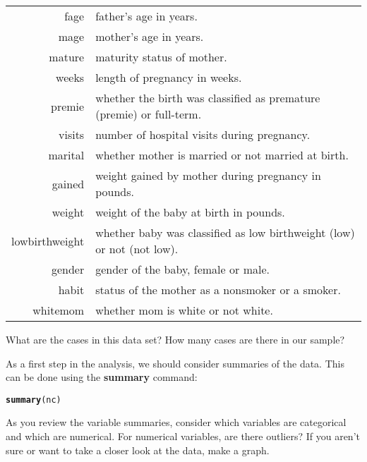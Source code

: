 \documentclass{article}\usepackage[]{graphicx}\usepackage[]{color}
\makeatletter
\newcommand{\hlstr}[1]{\textcolor[rgb]{0.192,0.494,0.8}{#1}}%
\newcommand{\hlstd}[1]{\textcolor[rgb]{0.345,0.345,0.345}{#1}}%
\newcommand{\hlkwd}[1]{\textcolor[rgb]{0.737,0.353,0.396}{\textbf{#1}}}%
\newenvironment{kframe}{%
 \def\at@end@of@kframe{}%
 \ifinner\ifhmode%
  \def\at@end@of@kframe{\end{minipage}}%
  \begin{minipage}{\columnwidth}%
 \fi\fi%
 \def\FrameCommand##1{\hskip\@totalleftmargin \hskip-\fboxsep
 \colorbox{shadecolor}{##1}\hskip-\fboxsep
     \hskip-\linewidth \hskip-\@totalleftmargin \hskip\columnwidth}%
 \MakeFramed {\advance\hsize-\width
   \@totalleftmargin\z@ \linewidth\hsize
   \@setminipage}}%
 {\par\unskip\endMakeFramed%
 \at@end@of@kframe}
\newenvironment{knitrout}{}{} %
\makeatother
\begin{document}
\begin{table}[h] \small
\begin{tabular}{r | l}
\hlstd{fage} & father's age in years. \\
\hlstd{mage} & mother's age in years. \\
\hlstd{mature} & maturity status of mother. \\
\hlstd{weeks} & length of pregnancy in weeks. \\
\hlstd{premie} & whether the birth was classified as premature (premie) or full-term. \\
\hlstd{visits} & number of hospital visits during pregnancy. \\
\hlstd{marital} & whether mother is \hlstr{married} or \hlstr{not married} at birth. \\
\hlstd{gained} & weight gained by mother during pregnancy in pounds. \\
\hlstd{weight} & weight of the baby at birth in pounds. \\
\hlstd{lowbirthweight} & whether baby was classified as low birthweight (\hlstr{low}) or not (\hlstr{not low}). \\
\hlstd{gender} & gender of the baby, \hlstr{female} or \hlstr{male}. \\
\hlstd{habit} & status of the mother as a \hlstr{nonsmoker} or a \hlstr{smoker}. \\
\hlstd{whitemom} & whether mom is \hlstr{white} or \hlstr{not white}. \\
\end{tabular}
\end{table}

\begin{exercise}
What are the cases in this data set? How many cases are there in our sample?
\end{exercise}

As a first step in the analysis, we should consider summaries of the data. This can be done using the \hlkwd{summary} command:

\begin{knitrout}
\color{fgcolor}\begin{kframe}
\begin{alltt}
\hlkwd{summary}\hlstd{(nc)}
\end{alltt}
\end{kframe}
\end{knitrout}


As you review the variable summaries, consider which variables are categorical and which are numerical. For numerical variables, are there outliers? If you aren't sure or want to take a closer look at the data, make a graph.
\end{document}
